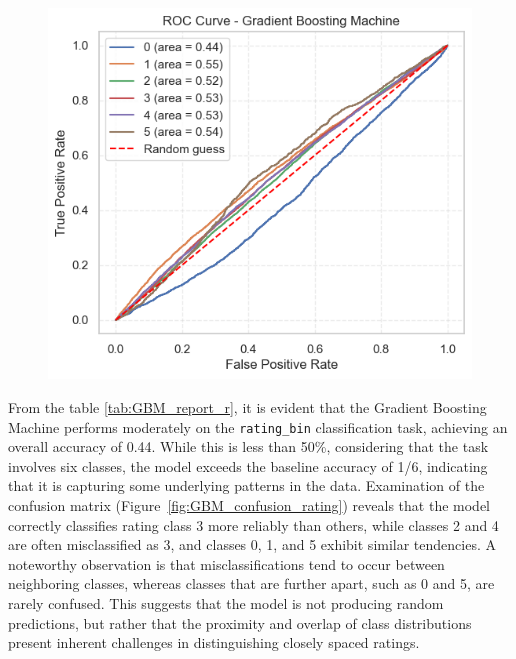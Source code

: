 \begin{figure}[ht]
\begin{minipage}{0.4\textwidth}
    \label{fig:GBM_confusion_rating} 
    \end{minipage}
    \begin{minipage}{0.4\textwidth} 
    \centering
    \includegraphics[width=\textwidth]{plotsss/GBM_ROC_rating.png} 
    \label{fig:GBM_ROC_rating} 
    \end{minipage}

    \end{figure}

From the table \ref{tab:GBM_report_r}, it is evident that the Gradient Boosting Machine performs moderately on the 
\texttt{rating\_bin} classification task, achieving an overall accuracy of 0.44. While this is less than 50\%, 
considering that the task involves six classes, the model exceeds the baseline accuracy of 1/6, indicating that it is 
capturing some underlying patterns in the data. Examination of the confusion matrix (Figure~\ref{fig:GBM_confusion_rating}) 
reveals that the model correctly classifies rating class 3 more reliably than others, while classes 2 and 4 are often misclassified 
as 3, and classes 0, 1, and 5 exhibit similar tendencies. A noteworthy observation is that misclassifications tend to 
occur between neighboring classes, whereas classes that are further apart, such as 0 and 5, are rarely confused. 
This suggests that the model is not producing random predictions, but rather that the proximity and overlap of 
class distributions present inherent challenges in distinguishing closely spaced ratings.

